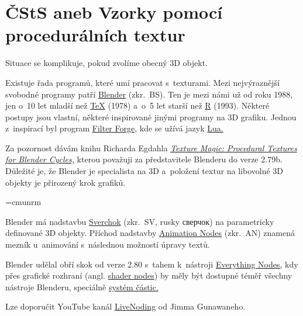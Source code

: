 \section{ČStS aneb Vzorky pomocí procedurálních textur}

Situace se komplikuje, pokud zvolíme obecný 3D objekt.

Existuje řada programů, které umí pracovat s~texturami. Mezi nejvýraznější svobodné programy patří 
\href{https://www.blender.org/}{Blender} (zkr.~BS).
Ten je mezi námi už od roku 1988, jen o~10 let mladší než 
\href{http://tug.org/}{\TeX{}} (1978) a~o~5 let starší než 
\href{https://www.r-project.org/}{R} (1993). Některé postupy jsou vlastní, některé inspirované jinými programy na 3D grafiku.
Jednou z~inspirací byl program 
\href{https://filterforge.com/}{Filter Forge,} kde se užívá jazyk 
\href{https://www.lua.org/}{Lua.}

Za pozornost dávám knihu Richarda Egdahla 
\href{https://www.amazon.com/Texture-Magic-Procedural-Textures-Blender-ebook/dp/B01DI5KK44}{\emph{Texture Magic: Procedural Textures for Blender Cycles,}} 
kterou považuji za představitele Blenderu do verze 2.79b. Důležité je, že Blender je specialista na 3D a~položení textur na libovolné 3D objekty je přirozený krok grafiků. 

\font\rustina=cmunrm %

Blender má %
nadstavbu
\href{http://nikitron.cc.ua/sverchok_en.html}{Sverchok} (zkr.~SV, rusky {\rustina сверчок})
na parametricky definované 3D objekty. Příchod nadstavby 
\href{https://animation-nodes.com/}{Animation Nodes} (zkr.~AN) znamená mezník u~animování s~následnou možností úpravy textů.

Blender udělal obří skok od verze 2.80 s~tahem k~nástroji 
\href{https://wiki.blender.org/wiki/Source/Nodes/EverythingNodes}{Everything Nodes,} kdy přes grafické rozhraní (angl. 
\href{https://docs.blender.org/manual/en/latest/render/shader_nodes/index.html}{shader nodes}) by měly být dostupné téměř všechny nástroje Blenderu, speciálně 
\href{https://docs.blender.org/manual/en/latest/physics/particles/index.html}{systém částic.} 
%

Lze doporučit YouTube kanál 
\href{https://www.youtube.com/playlist?list=PLsbztkb4az9gVNKH1ai7Kxj37e7gZPD75}{LiveNoding} od Jimma Gunawaneho.



